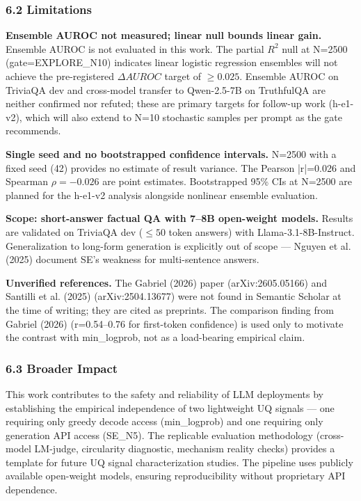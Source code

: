 \subsubsection{6.2 Limitations}

\textbf{Ensemble AUROC not measured; linear null bounds linear gain.} Ensemble AUROC is not evaluated in this work. The partial $R^2$ null at N=2500 (gate=EXPLORE\_N10) indicates linear logistic regression ensembles will not achieve the pre-registered $\Delta AUROC$ target of $\geq 0.025$. Ensemble AUROC on TriviaQA dev and cross-model transfer to Qwen-2.5-7B on TruthfulQA are neither confirmed nor refuted; these are primary targets for follow-up work (h-e1-v2), which will also extend to N=10 stochastic samples per prompt as the gate recommends.

\textbf{Single seed and no bootstrapped confidence intervals.} N=2500 with a fixed seed (42) provides no estimate of result variance. The Pearson |r|=0.026 and Spearman $\rho=-0.026$ are point estimates. Bootstrapped 95\% CIs at N=2500 are planned for the h-e1-v2 analysis alongside nonlinear ensemble evaluation.

\textbf{Scope: short-answer factual QA with 7--8B open-weight models.} Results are validated on TriviaQA dev ($\leq 50$ token answers) with Llama-3.1-8B-Instruct. Generalization to long-form generation is explicitly out of scope --- Nguyen et al. (2025) document SE's weakness for multi-sentence answers.

\textbf{Unverified references.} The Gabriel (2026) paper (arXiv:2605.05166) and Santilli et al. (2025) (arXiv:2504.13677) were not found in Semantic Scholar at the time of writing; they are cited as preprints. The comparison finding from Gabriel (2026) (r=0.54--0.76 for first-token confidence) is used only to motivate the contrast with min\_logprob, not as a load-bearing empirical claim.

\subsubsection{6.3 Broader Impact}

This work contributes to the safety and reliability of LLM deployments by establishing the empirical independence of two lightweight UQ signals --- one requiring only greedy decode access (min\_logprob) and one requiring only generation API access (SE\_N5). The replicable evaluation methodology (cross-model LM-judge, circularity diagnostic, mechanism reality checks) provides a template for future UQ signal characterization studies. The pipeline uses publicly available open-weight models, ensuring reproducibility without proprietary API dependence.

